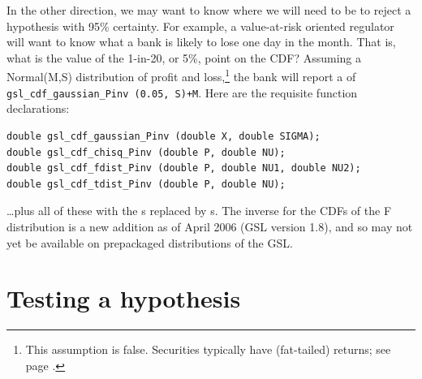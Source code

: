 In the other direction, we may want to know where we will need to be to reject a hypothesis with 95\%
certainty. For example, a value-at-risk oriented regulator will want to know what a bank is likely to lose 
one day in the month. That is, what is the value of the 1-in-20, or 5\%, point on the CDF?
Assuming a Normal(M,S) distribution of profit and loss,\footnote{This assumption is false. Securities
typically have  (fat-tailed) returns; see page \pageref{kurt1}.} the bank will report a  of {\tt
gsl\_cdf\_gaussian\_Pinv (0.05, S)+M}. Here are the requisite function declarations:
\begin{lstlisting}
double gsl_cdf_gaussian_Pinv (double X, double SIGMA);
double gsl_cdf_chisq_Pinv (double P, double NU);
double gsl_cdf_fdist_Pinv (double P, double NU1, double NU2);
double gsl_cdf_tdist_Pinv (double P, double NU);
\end{lstlisting}
\dots plus all of these with the s replaced by s.
The inverse for the CDFs of the F distribution is a new addition as of
April 2006 (GSL version 1.8), and so may not yet be available on prepackaged
distributions of the GSL.





\section{Testing a hypothesis}





